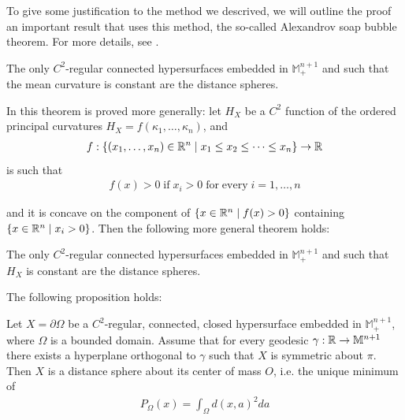 To give some justification to the method we descrived, we will outline the proof an important result that uses this method, the so-called Alexandrov soap bubble theorem. For more details, see \cite{italiani}. 

\begin{theorem}
	The only $C^2$-regular connected hypersurfaces embedded in $\mathbb{M}^{n+1}_+$ and such that the mean curvature is constant are the distance spheres.\label{Alexandrov theorem} 
\end{theorem}
In \cite{italiani} this theorem is proved more generally: let $H_X$ be a $C^2$ function of the ordered principal curvatures $H_X=f(\kappa_1, \dots, \kappa_n)$, and
\begin{align*}
	f:\{(x_1, \dots, x_n)\in \mathbb{R}^n \;|\;x_1\leq x_2\leq \dots \leq x_n \}\rightarrow \mathbb{R}
\end{align*}
is such that
\begin{align*}
	f(x)>0 \;\mathrm{if \;} x_i>0 \; \mathrm{for \; every \;} i=1, \dots, n
\end{align*}

and it is concave on the component of $\{x\in \mathbb{R}^n \;|\; f(x)>0\}$ containing $\{x\in \mathbb{R}^n \;|\;  x_i>0 \}$. Then the following more general theorem holds: 

\begin{theorem}
	The only $C^2$-regular connected hypersurfaces embedded in $\mathbb{M}^{n+1}_+$ and such that $H_X$ is constant are the distance spheres. 
\end{theorem}

The following proposition holds:

\begin{proposition}
	\label{proposition symmetry conclusion}	Let $X=\partial\Omega$ be a $C^2$-regular, connected, closed hypersurface embedded in $\mathbb{M}^{n+1}_+$, where $\Omega$ is a bounded domain. Assume that for every geodesic $\gamma:\mathbb{R}\rightarrow \mathbb{M}^{n+1}$ there exists a hyperplane orthogonal to $\gamma$ such that $X$ is symmetric about $\pi$. Then $X$ is a distance sphere about its center of mass $O$, i.e. the unique minimum of 
	\begin{align*}
		P_\Omega(x)=\int_\Omega d(x, a)^2 da
	\end{align*}
\end{proposition}

